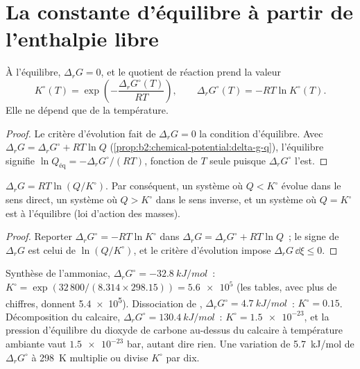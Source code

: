 \section{La constante d'équilibre à partir de l'enthalpie libre}

\begin{theorem}\label{thm:b2:equilibrium-shifts:k-from-g}
À l'équilibre, $\Delta_r G = 0$, et le quotient de réaction prend la valeur
\[
  K^\circ(T) = \exp\!\left(-\frac{\Delta_r G^\circ(T)}{RT}\right), \qquad
  \Delta_r G^\circ(T) = -RT\ln K^\circ(T) .
\]
Elle ne dépend que de la température.
\end{theorem}

\begin{proof}
Le critère d'évolution fait de $\Delta_r G = 0$ la condition d'équilibre.
Avec $\Delta_r G = \Delta_r G^\circ + RT\ln Q$
(\cref{prop:b2:chemical-potential:delta-g-q}), l'équilibre signifie $\ln Q_{\text{éq}}
= -\Delta_r G^\circ/(RT)$, fonction de $T$ seule puisque $\Delta_r G^\circ$ l'est.
\end{proof}

\begin{corollary}\label{cor:b2:equilibrium-shifts:mass-action}
$\Delta_r G = RT\ln(Q/K^\circ)$. Par conséquent, un système où $Q < K^\circ$ évolue
dans le sens direct, un système où $Q > K^\circ$ dans le sens inverse, et un système où $Q = K^\circ$ est à
l'équilibre (loi d'action des masses).
\end{corollary}

\begin{proof}
Reporter $\Delta_r G^\circ = -RT\ln K^\circ$ dans $\Delta_r G = \Delta_r G^\circ
+ RT\ln Q$~; le signe de $\Delta_r G$ est celui de $\ln(Q/K^\circ)$, et le
critère d'évolution impose $\Delta_r G\,\dd\xi \leq 0$.
\end{proof}

\begin{example}\label{ex:b2:equilibrium-shifts:constants}
Synthèse de l'ammoniac, $\Delta_r G^\circ = \qty{-32.8}{kJ/mol}$~: $K^\circ =
\exp(32\,800/(8.314 \times 298.15)) = \num{5.6e5}$ (les tables, avec plus de
chiffres, donnent \num{5.4e5}). Dissociation de , $\Delta_r G^\circ =
\qty{+4.7}{kJ/mol}$~: $K^\circ = 0.15$. Décomposition du calcaire,
$\Delta_r G^\circ = \qty{+130.4}{kJ/mol}$~: $K^\circ = \num{1.5e-23}$, et la
pression d'équilibre du dioxyde de carbone au-dessus du calcaire à température ambiante
vaut $\num{1.5e-23}$ bar, autant dire rien. Une variation de \qty{5.7}{kJ/mol} de
$\Delta_r G^\circ$ à \qty{298}{K} multiplie ou divise $K^\circ$ par dix.
\end{example}

